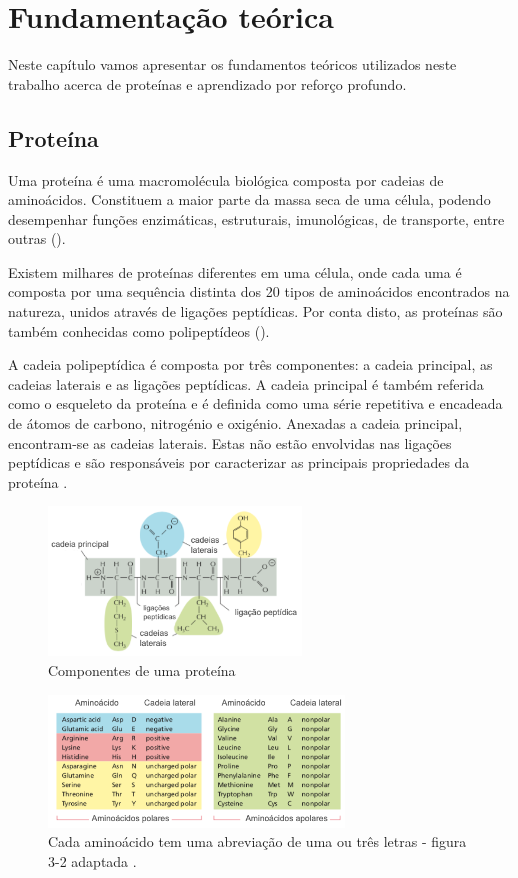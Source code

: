 \chapter{Fundamentação teórica}

Neste capítulo vamos apresentar os fundamentos teóricos utilizados neste trabalho acerca de proteínas e aprendizado por reforço profundo. 


\section{Proteína}
Uma proteína é uma macromolécula biológica composta por cadeias de aminoácidos. 
Constituem a maior parte da massa seca de uma célula, podendo desempenhar funções enzimáticas, estruturais,
imunológicas, de transporte, entre outras (\cite{Bio}). 

Existem milhares de proteínas diferentes em uma célula,
onde cada uma é composta por uma sequência distinta dos 20 tipos de aminoácidos encontrados na natureza,
unidos através de ligações peptídicas.
Por conta disto, as proteínas são também conhecidas como polipeptídeos (\cite{Bio}). 

A cadeia polipeptídica é composta por três componentes: a cadeia principal,
as cadeias laterais e as ligações peptídicas.
A cadeia principal é também referida como o esqueleto da proteína e
é definida como uma série repetitiva e encadeada de átomos de carbono,
nitrogénio e oxigénio. Anexadas a cadeia principal, encontram-se as cadeias laterais. 
Estas não estão envolvidas nas ligações peptídicas e são responsáveis por caracterizar as principais propriedades da proteína \cite{Bio}. 

\begin{figure}[H]
     \centering
     \includegraphics[width=0.6\textwidth]{figuras/ProteinBackbone.png}
     \caption{Componentes de uma proteína}
\end{figure}

\begin{figure}[H]
     \centering
     \includegraphics[width=0.7\textwidth]{figuras/20Aminoacidos.png}
     \caption[Aminiácidos]{Cada aminoácido tem uma abreviação de uma ou três letras - figura 3-2 adaptada \cite{Bio}.}
\end{figure}


